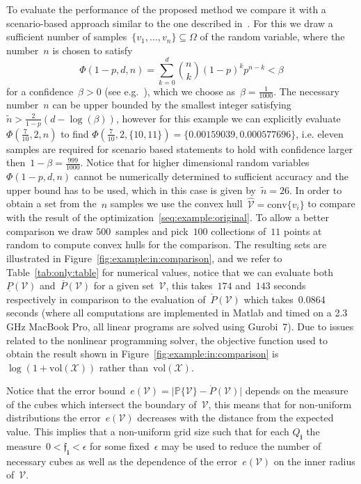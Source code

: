 \documentclass[letterpaper, 10pt, conference]{ieeeconf} %
\providecommand{\conv}{\text{conv}}
\providecommand{\bfa}[1]{\mathbf{#1}}
\begin{document}
%
To evaluate the performance of the proposed method we compare it with a scenario-based approach similar to the one described in~\cite{Margellos:2014}.
%
For this we draw a sufficient number of samples~$\{v_1,\dots,v_n\}\subseteq\Omega$ of the random variable, where the number~$n$ is chosen to satisfy
\[
\Phi(1-p,d,n) = \sum_{k=0}^{d}\binom{n}{k}(1-p)^kp^{n-k}<\beta
\]
for a confidence~$\beta>0$ (see e.g.~\cite{calafiore2010}), which we choose as~$\beta=\frac{1}{1000}$.
%
The necessary number~$n$ can be upper bounded by the smallest integer satisfying~$\tilde n>\frac{2}{1-p}(d-\log(\beta))$, however for this example we can explicitly evaluate~$\Phi(\frac{7}{10},2,n)$ to find $\Phi(\frac{7}{10},2,\{10,11\}) = \{0.00159039,0.000577696\}$, i.e. eleven samples are required for scenario based statements to hold with confidence larger then~$1-\beta=\frac{999}{1000}$.
%
Notice that for higher dimensional random variables~$\Phi(1-p,d,n)$ cannot be numerically determined to sufficient accuracy and the upper bound has to be used, which in this case is given by~$\tilde n=26$.
%
In order to obtain a set from the~$n$ samples we use the convex hull~$\hat{\mathcal V}=\conv\{v_i\}$ to compare with the result of the optimization~\eqref{seq:example:original}.
%
To allow a better comparison we draw $500$~samples and pick~$100$ collections of~$11$ points at random to compute convex hulls for the comparison.
%
The resulting sets are illustrated in Figure~\ref{fig:example:in:comparison}, and we refer to Table~\ref{tab:only:table} for numerical values, notice that we can evaluate both~$\underline{P}(\mathcal V)$ and~$\overline{P}(\mathcal V)$ for a given set~$\mathcal V$, this takes~$174$ and~$143$ seconds respectively in comparison to the evaluation of~$\mathring{P}(\mathcal V)$ which takes~$0.0864$ seconds (where all computations are implemented in Matlab and timed on a 2.3 GHz MacBook Pro, all linear programs are solved using Gurobi~7).
%
Due to issues related to the nonlinear programming solver, the objective function used to obtain the result shown in Figure~\ref{fig:example:in:comparison} is~$\log(1+\text{vol}(\mathcal X))$ rather than~$\text{vol}(\mathcal X)$.
%


%
Notice that the error bound~$e(\mathcal V) = \lvert\mathbb P\{\mathcal V\}-\mathring{P}(\mathcal V)\rvert$ depends on the measure of the cubes which intersect the boundary of~$\mathcal V$, this means that for non-uniform distributions the error~$e(\mathcal V)$ decreases with the distance from the expected value.
%
This implies that a non-uniform grid size such that for each $Q_\bfa{i}$ the measure~$0<\mathfrak{f}_\bfa{i}<\epsilon$ for some fixed~$\epsilon$ may be used to reduce the number of necessary cubes as well as the dependence of the error~$e(\mathcal V)$ on the inner radius of~$\mathcal V$.
\end{document}

